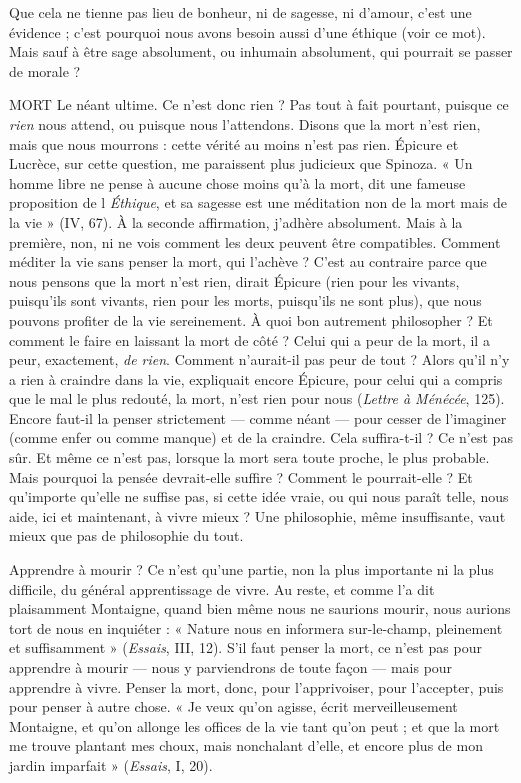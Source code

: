 Que cela ne tienne pas lieu de bonheur, ni de sagesse, ni d’amour, c’est une
évidence ; c’est pourquoi nous avons besoin aussi d’une éthique (voir ce mot).
Mais sauf à être sage absolument, ou inhumain absolument, qui pourrait se
passer de morale ?

MORT Le néant ultime. Ce n’est donc rien ? Pas tout à fait pourtant, puisque
ce {\it rien} nous attend, ou puisque nous l’attendons. Disons que la
mort n’est rien, mais que nous mourrons : cette vérité au moins n’est pas rien.
Épicure et Lucrèce, sur cette question, me paraissent plus judicieux que Spinoza.
« Un homme libre ne pense à aucune chose moins qu’à la mort, dit une
fameuse proposition de l {\it Éthique}, et sa sagesse est une méditation non de la mort
mais de la vie » (IV, 67). À la seconde affirmation, j’adhère absolument. Mais à
la première, non, ni ne vois comment les deux peuvent être compatibles. Comment
méditer la vie sans penser la mort, qui l’achève ? C’est au contraire parce
que nous pensons que la mort n’est rien, dirait Épicure (rien pour les vivants,
puisqu'ils sont vivants, rien pour les morts, puisqu'ils ne sont plus), que nous
pouvons profiter de la vie sereinement. À quoi bon autrement philosopher ? Et
comment le faire en laissant la mort de côté ? Celui qui a peur de la mort, il a
peur, exactement, {\it de rien}. Comment n’aurait-il pas peur de tout ? Alors qu’il n’y
a rien à craindre dans la vie, expliquait encore Épicure, pour celui qui a compris
que le mal le plus redouté, la mort, n’est rien pour nous ({\it Lettre à Ménécée}, 125).
Encore faut-il la penser strictement — comme néant — pour cesser de l’imaginer
(comme enfer ou comme manque) et de la craindre. Cela suffira-t-il ? Ce n’est
pas sûr. Et même ce n’est pas, lorsque la mort sera toute proche, le plus probable.
Mais pourquoi la pensée devrait-elle suffire ? Comment le pourrait-elle ? Et
qu'importe qu’elle ne suffise pas, si cette idée vraie, ou qui nous paraît telle, nous
aide, ici et maintenant, à vivre mieux ? Une philosophie, même insuffisante, vaut
mieux que pas de philosophie du tout.

Apprendre à mourir ? Ce n’est qu’une partie, non la plus importante ni la
plus difficile, du général apprentissage de vivre. Au reste, et comme l’a dit plaisamment
Montaigne, quand bien même nous ne saurions mourir, nous aurions
tort de nous en inquiéter : « Nature nous en informera sur-le-champ, pleinement
et suffisamment » ({\it Essais}, III, 12). S’il faut penser la mort, ce n’est pas
pour apprendre à mourir — nous y parviendrons de toute façon — mais pour
apprendre à vivre. Penser la mort, donc, pour l’apprivoiser, pour l’accepter,
puis pour penser à autre chose. « Je veux qu’on agisse, écrit merveilleusement
Montaigne, et qu’on allonge les offices de la vie tant qu’on peut ; et que la mort
me trouve plantant mes choux, mais nonchalant d’elle, et encore plus de mon
jardin imparfait » ({\it Essais}, I, 20).

